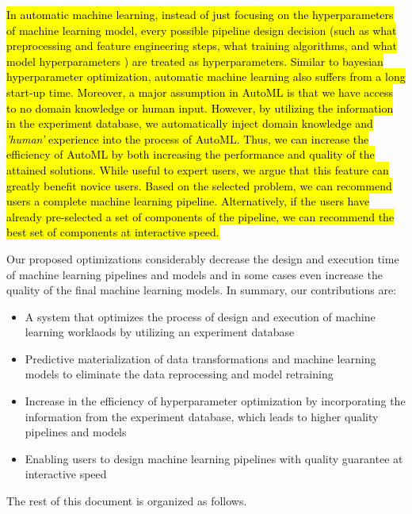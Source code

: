 \hl{
In automatic machine learning, instead of just focusing on the hyperparameters of machine learning model, every possible pipeline design decision (such as what preprocessing and feature engineering steps, what training algorithms, and what model hyperparameters ) are treated as hyperparameters.
Similar to bayesian hyperparameter optimization, automatic machine learning also suffers from a long start-up time.
Moreover, a major assumption in AutoML is that we have access to no domain knowledge or human input.
However, by utilizing the information in the experiment database, we automatically inject domain knowledge and \textit{'human'} experience into the process of AutoML.
Thus, we can increase the efficiency of AutoML by both increasing the performance and quality of the attained solutions.
While useful to expert users, we argue that this feature can greatly benefit novice users.
Based on the selected problem, we can recommend users a complete machine learning pipeline.
Alternatively, if the users have already pre-selected a set of components of the pipeline, we can recommend the best set of components at interactive speed.}

Our proposed optimizations considerably decrease the design and execution time of machine learning pipelines and models and in some cases even increase the quality of the final machine learning models.
In summary, our contributions are:
\begin{itemize}
\item A system that optimizes the process of design and execution of machine learning worklaods by utilizing an experiment database
\item Predictive materialization of data transformations and machine learning models to eliminate the data reprocessing and model retraining
\item Increase in the efficiency of hyperparameter optimization by incorporating the information from the experiment database, which leads to higher quality pipelines and models
\item Enabling users to design machine learning pipelines with quality guarantee at interactive speed
\end{itemize}

The rest of this document is organized as follows.